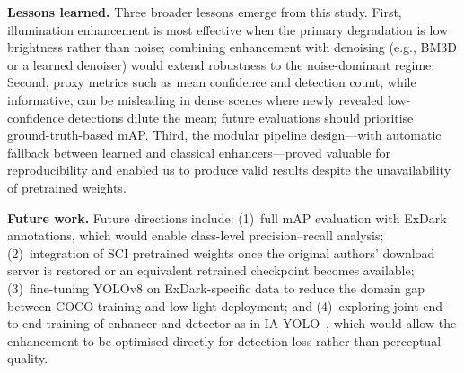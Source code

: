 \documentclass[conference]{IEEEtran}
\begin{document}
\textbf{Lessons learned.}
Three broader lessons emerge from this study.  First, illumination
enhancement is most effective when the primary degradation is
low brightness rather than noise; combining enhancement with
denoising (e.g., BM3D or a learned denoiser) would extend
robustness to the noise-dominant regime.  Second, proxy metrics such as
mean confidence and detection count, while informative, can be
misleading in dense scenes where newly revealed low-confidence
detections dilute the mean; future evaluations should prioritise
ground-truth-based mAP.  Third, the modular pipeline design---with
automatic fallback between learned and classical enhancers---proved
valuable for reproducibility and enabled us to produce valid results
despite the unavailability of pretrained weights.

\textbf{Future work.}
Future directions include:
(1)~full mAP evaluation with ExDark annotations, which would enable
class-level precision--recall analysis;
(2)~integration of SCI pretrained weights once the original authors'
download server is restored or an equivalent retrained checkpoint
becomes available;
(3)~fine-tuning YOLOv8 on ExDark-specific data to reduce the domain
gap between COCO training and low-light deployment;
and (4)~exploring joint end-to-end training of enhancer and detector
as in IA-YOLO~\cite{liu2022iayolo}, which would allow the enhancement
to be optimised directly for detection loss rather than perceptual
quality.
\end{document}
